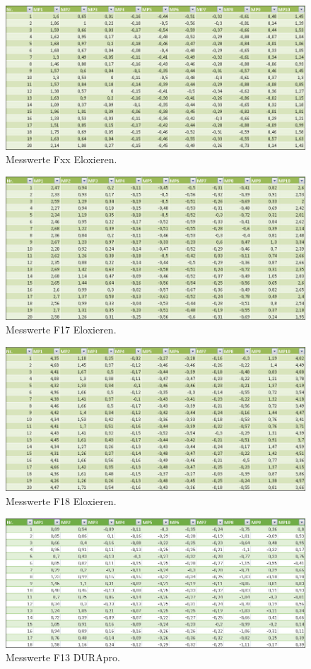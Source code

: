 \begin{figure}[H]
\centering
\includegraphics[width=.8\textwidth]{Fxxelox}
\caption{Messwerte Fxx Eloxieren.}
\label{Fxxelox}
\end{figure}
\begin{figure}[H]
\centering
\includegraphics[width=.8\textwidth]{F17elox}
\caption{Messwerte F17 Eloxieren.}
\label{F17elox}
\end{figure}
\begin{figure}[H]
\centering
\includegraphics[width=.8\textwidth]{F18elox}
\caption{Messwerte F18 Eloxieren.}
\label{F18elox}
\end{figure}
\begin{figure}[H]
\centering
\includegraphics[width=.8\textwidth]{F13durapro}
\caption{Messwerte F13 DURApro.}
\label{F13durapro}
\end{figure}
